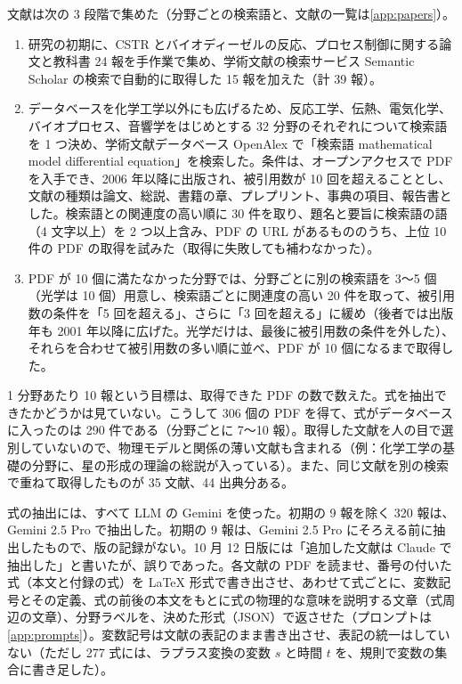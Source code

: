 \documentclass[11pt,a4paper]{ltjsarticle}
\begin{document}
文献は次の 3 段階で集めた（分野ごとの検索語と、文献の一覧は\ref{app:papers}）。
\begin{enumerate}[leftmargin=2.2em]
  \item 研究の初期に、CSTR とバイオディーゼルの反応、プロセス制御に関する論文と教科書 24 報を手作業で集め、学術文献の検索サービス Semantic Scholar の検索で自動的に取得した 15 報を加えた（計 39 報）。
  \item データベースを化学工学以外にも広げるため、反応工学、伝熱、電気化学、バイオプロセス、音響学をはじめとする 32 分野のそれぞれについて検索語を 1 つ決め、学術文献データベース OpenAlex で「検索語 mathematical model differential equation」を検索した。条件は、オープンアクセスで PDF を入手でき、2006 年以降に出版され、被引用数が 10 回を超えることとし、文献の種類は論文、総説、書籍の章、プレプリント、事典の項目、報告書とした。検索語との関連度の高い順に 30 件を取り、題名と要旨に検索語の語（4 文字以上）を 2 つ以上含み、PDF の URL があるもののうち、上位 10 件の PDF の取得を試みた（取得に失敗しても補わなかった）。
  \item PDF が 10 個に満たなかった分野では、分野ごとに別の検索語を 3〜5 個（光学は 10 個）用意し、検索語ごとに関連度の高い 20 件を取って、被引用数の条件を「5 回を超える」、さらに「3 回を超える」に緩め（後者では出版年も 2001 年以降に広げた。光学だけは、最後に被引用数の条件を外した）、それらを合わせて被引用数の多い順に並べ、PDF が 10 個になるまで取得した。
\end{enumerate}
1 分野あたり 10 報という目標は、取得できた PDF の数で数えた。式を抽出できたかどうかは見ていない。こうして 306 個の PDF を得て、式がデータベースに入ったのは 290 件である（分野ごとに 7〜10 報）。取得した文献を人の目で選別していないので、物理モデルと関係の薄い文献も含まれる（例：化学工学の基礎の分野に、星の形成の理論の総説が入っている）。また、同じ文献を別の検索で重ねて取得したものが 35 文献、44 出典分ある。

式の抽出には、すべて LLM の Gemini を使った。初期の 9 報を除く 320 報は、Gemini 2.5 Pro で抽出した。初期の 9 報は、Gemini 2.5 Pro にそろえる前に抽出したもので、版の記録がない。10 月 12 日版には「追加した文献は Claude で抽出した」と書いたが、誤りであった。各文献の PDF を読ませ、番号の付いた式（本文と付録の式）を \LaTeX{} 形式で書き出させ、あわせて式ごとに、変数記号とその定義、式の前後の本文をもとに式の物理的な意味を説明する文章（式周辺の文章）、分野ラベルを、決めた形式（JSON）で返させた（プロンプトは\ref{app:prompts}）。変数記号は文献の表記のまま書き出させ、表記の統一はしていない（ただし 277 式には、ラプラス変換の変数 $s$ と時間 $t$ を、規則で変数の集合に書き足した）。
\end{document}
